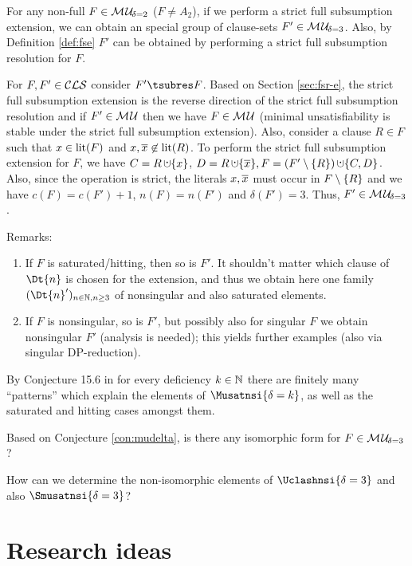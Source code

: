 \documentclass{report}
\begin{document}
\begin{lem}\label{lem:mu2tomu3}
For any non-full $F \in \mathcal{M\hspace{0.8pt}U}_{\!\delta=2}$ ($F \not = A_2$), if we perform a strict full subsumption extension, we can obtain an special group of clause-sets $F' \in \mathcal{M\hspace{0.8pt}U}_{\!\delta=3}$. Also, by Definition \ref{def:fse} $F'$ can be obtained by performing a strict full subsumption resolution for $F$.
\end{lem}
\begin{prf}
For $F, F' \in \mathcal{CLS}$ consider $ F' \tsubres F$. Based on Section \ref{sec:fsr-e}, the strict full subsumption extension is the reverse direction of the  strict full subsumption resolution and if $F' \in \mathcal{M\hspace{0.8pt}U}$ then we have $F \in \mathcal{M\hspace{0.8pt}U}$ (minimal unsatisfiability is stable under the strict full subsumption extension). Also, consider a clause $R \in F$ such that $ x \in \operatorname{lit}(F)$ and $x, \overline x \not \in \operatorname{lit}(R)$. To perform the strict full subsumption extension for $F$, we have $C = R \addcup \set{x}$, $D = R \addcup \set{\ol{x}}, F = (F' \sm \set{R}) \addcup \set{C,D}$. Also, since the operation is strict, the literals $x, \overline x$ must occur in $F \setminus \{ R \}$ and we have $c(F)=c(F')+1$, $n(F)=n(F')$ and $\delta(F')=3$. Thus, $F' \in \mathcal{M\hspace{0.8pt}U}_{\!\delta=3}$.

\end{prf}
Remarks:
\begin{enumerate}
\item If $F$ is saturated/hitting, then so is $F'$. It shouldn't matter which clause of $\Dt{n}$ is chosen for the extension, and thus we obtain here one family $(\Dt{n}')_{n \in \NN, n \ge 3}$ of nonsingular and also saturated elements.
\item If $F$ is nonsingular, so is $F'$, but possibly also for singular $F$ we obtain nonsingular $F'$ (analysis is needed); this yields further examples (also via singular DP-reduction).
\end{enumerate}

\begin{conj}\label{con:mudelta}
By Conjecture 15.6 in \cite{KullmannZhao2010Extremal} for every deficiency $k \in \mathbb{N}$ there are finitely many ``patterns'' which explain the elements of $\Musatnsi{\delta=k}$, as well as the saturated and hitting cases amongst them.
\end{conj}
 
\begin{quest}\label{que:str-3}
Based on Conjecture \ref{con:mudelta}, is there any isomorphic form for $F \in \mathcal{M\hspace{0.8pt}U}_{\!\delta=3}$?
\end{quest}

\begin{quest}\label{que:smu-3}
How can we determine the non-isomorphic elements of $\Uclashnsi{\delta=3}$ and also $\Smusatnsi{\delta=3}$?
\end{quest}
\chapter{Research ideas}
\label{cha:concl}



\end{document}

